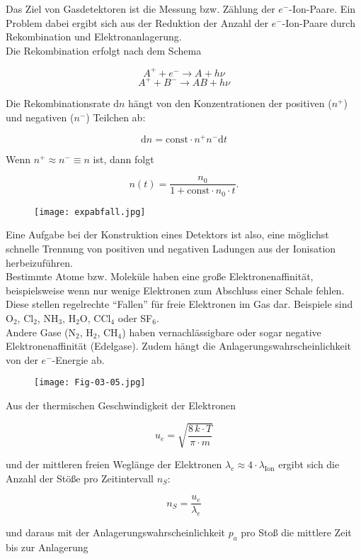 Das Ziel von Gasdetektoren ist die Messung bzw. Zählung der $e^-$-Ion-Paare. Ein Problem dabei
ergibt sich aus der Reduktion der Anzahl der $e^-$-Ion-Paare durch Rekombination und
Elektronanlagerung.
\\
Die Rekombination erfolgt nach dem Schema

\[A^+ + e^- \longrightarrow A + h\nu \]
\[A^+ + B^- \longrightarrow AB + h\nu  \]

Die Rekombinationsrate $\mathrm{d}n$ hängt von den Konzentrationen der positiven ($n^+$) und
negativen ($n^-$) Teilchen ab:

\[\mathrm{d}n= \text{const}\cdot n^+ n^- \mathrm{d}t \]

Wenn $n^+\approx n^-\equiv n$ ist, dann folgt

\[n(t) = \frac{n_0}{1+\text{const}\cdot n_0\cdot t}.  \]

\begin{figure}[H]
	\centering
	\texttt{[image: expabfall.jpg]}
\end{figure}

Eine Aufgabe bei der Konstruktion eines Detektors ist also, eine möglichst schnelle Trennung von
positiven und negativen Ladungen aus der Ionisation herbeizuführen.
\\
Bestimmte Atome bzw. Moleküle haben eine große Elektronenaffinität, beispielsweise wenn nur wenige
Elektronen zum Abschluss einer Schale fehlen. Diese stellen regelrechte "`Fallen"' für
freie Elektronen im Gas dar. Beispiele sind O$_2$, Cl$_2$, NH$_3$, H$_2$O, CCl$_4$ oder SF$_6$.
\\
Andere Gase (N$_2$, H$_2$, CH$_4$) haben vernachlässigbare oder sogar negative
Elektronenaffinität (Edelgase). Zudem hängt die Anlagerungswahrscheinlichkeit von der $e^-$-Energie
ab.

\begin{figure}[H]
	\centering
	\texttt{[image: Fig-03-05.jpg]}
\end{figure}

Aus der thermischen Geschwindigkeit der Elektronen 

\[u_e = \sqrt{\frac{8\,k\cdot T}{\pi\cdot m}}  \]

und der mittleren freien Weglänge der Elektronen $\lambda_e \approx 4\cdot \lambda_{\text{Ion}}$
ergibt sich die Anzahl der Stöße pro Zeitintervall $n_S$:

\[ n_S = \frac{u_e}{\lambda_e}  \]

und daraus mit der Anlagerungswahrscheinlichkeit $p_a$ pro Stoß die mittlere Zeit bis zur Anlagerung


